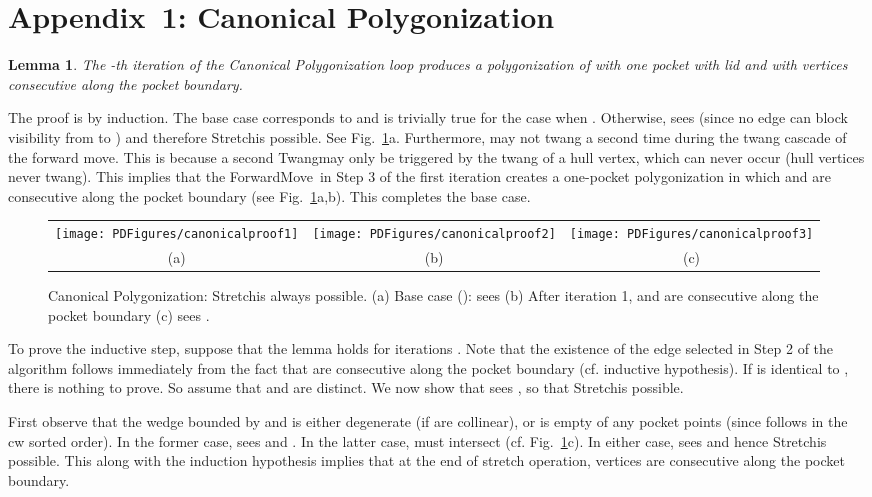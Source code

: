 \pdfoutput=1  \documentclass{article}
\def\st{{\sc Stretch}}
\def\tw{{\sc Twang}}
\def\fm{{\sc ForwardMove}}
\newtheorem{lemma}[theorem]{Lemma}
\newcommand{\figlab}[1]{\label{fig:#1}}
\newcommand{\figref}[1]{\ref{fig:#1}}
\newcommand{\ABox}{
\raisebox{3pt}{\framebox[6pt]{\rule{6pt}{0pt}}}
}
\newenvironment{pf}{{\bf Proof:}}{\hfill\ABox}
\begin{document}
\section*{Appendix~1: {\sc Canonical Polygonization}}
\begin{lemma}
The -th iteration of the {\sc Canonical Polygonization} loop
produces a polygonization of  with one pocket with lid  and
with vertices  consecutive along the pocket
boundary.
\end{lemma}
\begin{pf}
The proof is by induction.
The base case corresponds to  and is trivially true for the
case when . Otherwise,  sees  (since no edge
can block visibility from  to ) and therefore \st is possible. See
Fig.~\figref{canonical.proof.firstfig}a. Furthermore,  may not
twang a second time during the twang cascade of the forward move. This is because a second \tw may only be
triggered by the twang of a hull vertex, which can never occur (hull
vertices never twang). This implies that the \fm\ in Step 3 of the
first iteration creates a one-pocket polygonization in which 
and  are consecutive along the pocket boundary (see
Fig.~\figref{canonical.proof.firstfig}a,b). This completes the base
case.

\begin{figure}[htbp]
\centering
\begin{tabular}{c@{\hspace{0.01\linewidth}}c@{\hspace{0.01\linewidth}}c}
\texttt{[image: PDFigures/canonicalproof1]} &
\texttt{[image: PDFigures/canonicalproof2]} &
\texttt{[image: PDFigures/canonicalproof3]}
\\
(a) & (b) & (c)
\end{tabular}
\caption{{\sc Canonical Polygonization}: \st is always
possible. (a) Base case ():  sees  (b) After
iteration 1,  and  are consecutive along the pocket
boundary (c)  sees .} \figlab{canonical.proof.firstfig}
\end{figure}


To prove the inductive step, suppose that the lemma holds for
iterations .  Note that the existence of the edge
 selected in Step 2 of the algorithm follows immediately
from the fact that  are consecutive along
the pocket boundary (cf. inductive hypothesis).
If  is identical to , there is nothing to
prove. So assume that  and  are distinct. We
now show that  sees , so that \st is
possible.

First observe that the wedge bounded by  and  is
either degenerate (if  are collinear), or is
empty of any pocket points (since  follows  in the cw
sorted order). In the former case,  sees  and
. In the latter case,  must intersect 
(cf. Fig.~\figref{canonical.proof.firstfig}c). In either case, 
sees  and hence \st is possible. This
along with the induction hypothesis implies that at the end of
stretch operation, vertices  are consecutive
along the pocket boundary.


\end{pf}
\end{document}
